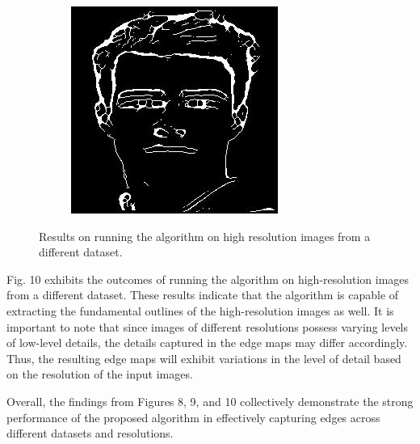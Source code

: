 \documentclass{70_styles/svproc}
\begin{document}
\begin{figure}
\begin{minipage}[b]{0.47\textwidth}
\begin{subfigure}[b]{0.4\textwidth}
     \end{subfigure}
     \begin{subfigure}[b]{0.4\textwidth}
         \centering
         \includegraphics[width=\textwidth]{70_figures/thinned-1 (107).jpg}
     \end{subfigure}
     \caption{Results on running the algorithm on high resolution images from a different dataset.}
    \end{minipage}
\end{figure}


Fig. 10 exhibits the outcomes of running the algorithm on high-resolution images from a different dataset. These results indicate that the algorithm is capable of extracting the fundamental outlines of the high-resolution images as well. It is important to note that since images of different resolutions possess varying levels of low-level details, the details captured in the edge maps may differ accordingly. Thus, the resulting edge maps will exhibit variations in the level of detail based on the resolution of the input images.

Overall, the findings from Figures 8, 9, and 10 collectively demonstrate the strong performance of the proposed algorithm in effectively capturing edges across different datasets and resolutions.
\end{document}
